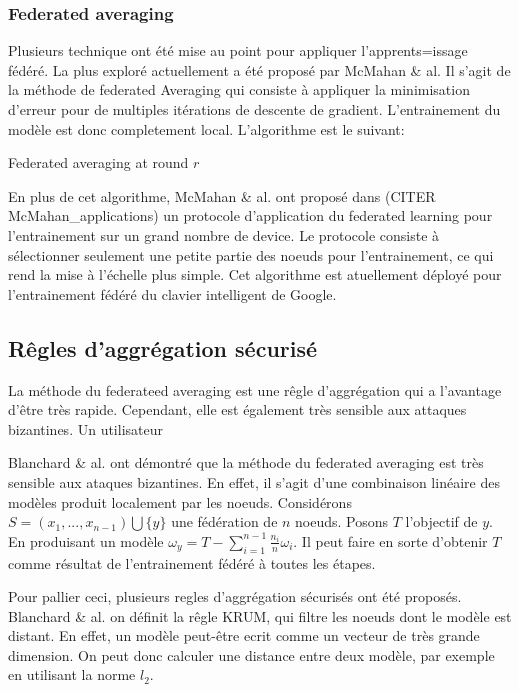 \documentclass[stage3a]{tnreport} %
\begin{document}
\subsubsection{Federated averaging}

Plusieurs technique ont été mise au point pour appliquer l'apprents=issage fédéré. La plus exploré actuellement a été proposé par McMahan \& al. Il s'agit de la méthode de federated Averaging qui consiste à appliquer la minimisation d'erreur pour de multiples itérations de descente de gradient. L'entrainement du modèle est donc completement local. L'algorithme est le suivant:

\begin{algorithm}[h]
  \caption{Federated averaging at round $r$}
  
 
\end{algorithm}

En plus de cet algorithme, McMahan \& al. ont proposé dans (CITER McMahan\_applications) un protocole d'application du federated learning pour l'entrainement sur un grand nombre de device. Le protocole consiste à sélectionner seulement une petite partie des noeuds pour l'entrainement, ce qui rend la mise à l'échelle plus simple. Cet algorithme est atuellement déployé pour l'entrainement fédéré du clavier intelligent de Google.

\subsection{Rêgles d'aggrégation sécurisé}

La méthode du federateed averaging est une rêgle d'aggrégation qui a l'avantage d'être très rapide. Cependant, elle est également très sensible aux attaques bizantines. Un utilisateur 

Blanchard \& al. ont démontré que la méthode du federated averaging est très sensible aux ataques bizantines. En effet, il s'agit d'une combinaison linéaire des modèles produit localement par les noeuds. Considérons $S=(x_1,...,x_{n-1})\bigcup \{y\}$ une fédération de $n$ noeuds. Posons $T$ l'objectif de $y$. En produisant un modèle $\omega_y= T - \sum_{i=1}^{n-1} \frac{n_i}{n} \omega_i $. Il peut faire en sorte d'obtenir $T$ comme résultat de l'entrainement fédéré à toutes les étapes.

Pour pallier ceci, plusieurs regles d'aggrégation sécurisés ont été proposés. Blanchard \& al. on définit la rêgle KRUM, qui filtre les noeuds dont le modèle est distant. En effet, un modèle peut-être ecrit comme un vecteur de très grande dimension. On peut donc calculer une distance entre deux modèle, par exemple en utilisant la norme $l_2$. 
\end{document}
